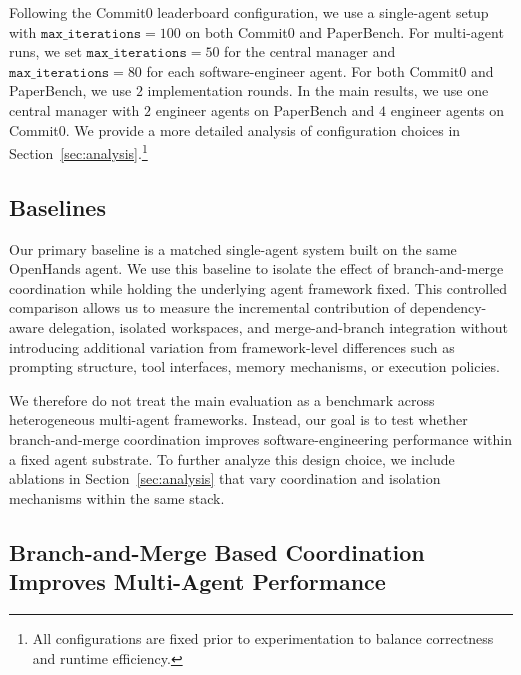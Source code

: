 Following the Commit0 leaderboard configuration, we use a single-agent setup with $\texttt{max\_iterations}=100$ on both Commit0 and PaperBench. For multi-agent runs, we set $\texttt{max\_iterations}=50$ for the central manager and $\texttt{max\_iterations}=80$ for each software-engineer agent. For both Commit0 and PaperBench, we use $2$ implementation rounds. In the main results, we use one central manager with $2$ engineer agents on PaperBench and $4$ engineer agents on Commit0. We provide a more detailed analysis of configuration choices in Section~\ref{sec:analysis}.\footnote{All configurations are fixed prior to experimentation to balance correctness and runtime efficiency.}

\subsection{Baselines}
Our primary baseline is a matched single-agent system built on the same OpenHands agent. We use this baseline to isolate the effect of branch-and-merge coordination while holding the underlying agent framework fixed. This controlled comparison allows us to measure the incremental contribution of dependency-aware delegation, isolated workspaces, and merge-and-branch integration without introducing additional variation from framework-level differences such as prompting structure, tool interfaces, memory mechanisms, or execution policies.

We therefore do not treat the main evaluation as a benchmark across heterogeneous multi-agent frameworks. Instead, our goal is to test whether branch-and-merge coordination improves software-engineering performance within a fixed agent substrate. To further analyze this design choice, we include ablations in Section~\ref{sec:analysis} that vary coordination and isolation mechanisms within the same stack.






\subsection{Branch-and-Merge Based Coordination Improves Multi-Agent Performance}


